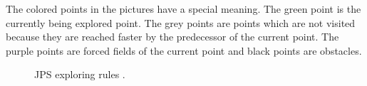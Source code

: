 \documentclass{article}
\begin{document}
    The colored points in the pictures have a special meaning. The green point is the currently being explored point. The grey points are points which are not visited because they are reached faster by the predecessor of the current point. The purple points are forced fields of the current point and black points are obstacles.
    
    
    
    
    \begin{figure}[!htb]
        \centering
        
        \caption{JPS exploring rules \cite{JPSexplained}.}
        
        \hfill
        
        \hfill
    \end{figure}
    
\end{document}
